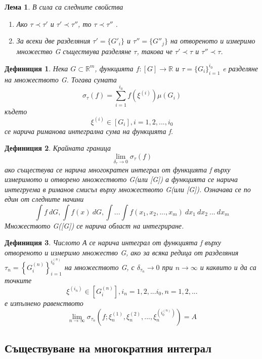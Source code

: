 \documentclass[a4paper,fleqn,12pt]{article}
\newtheorem{lemma}{Лема}[subsection]
\newtheorem{definition}{Дефиниция}[subsection]
\theoremstyle{definition}
\begin{document}
\begin{lemma}
В сила са следните свойства

\begin{enumerate}
\item Ако $\tau \prec \tau'$ и $\tau' \prec \tau''$, то $\tau \prec \tau''$ .
\item За всеки две разделяния $\tau' = \{ G'_i\}$ и $\tau'' = \{ G''_j\}$ на отвореното и измеримо множество G съществува разделяне $\tau$, такова че $\tau' \prec \tau$ и $\tau'' \prec \tau$.
\end{enumerate}

\end{lemma}

\begin{definition}
Нека $G \subset \mathbb{R}^m$, функцията $f: [G] \to \mathbb{R}$ и $\tau = \{ G_i\}_{i=1}^{i_0}$ e разделяне на множеството G. Тогава сумата 
$$\sigma_\tau (f) = \sum_{i=1} ^{i_0} f(\xi^{(i)})\mu(G_i)$$
където 
$$\xi^{(i)} \in [G_i], i = 1,2,..., i_0$$
се нарича риманова интегрална сума на функцията f. 
\end{definition}

\begin{definition}
Крайната граница 
$$\lim\limits_{\delta_\tau \to 0} \sigma_\tau (f)$$
ако съществува се нарича многократен интеграл от функцията f върху измеримото и отворено множеството G(или [G]) а функцията се нарича интегруема в риманов смисъл върху множеството G(или [G]). Означава се по един от следните начини 
$$\int f \ dG, \int f(x) \ dG, \int ... \int f(x_1, x_2,..., x_m) \ dx_1 \ dx_2 \ ... \ dx_m$$
Множеството G([G]) се нарича област на интегриране.
\end{definition}

\begin{definition}
Числото А се нарича интеграл от функцията f върху отвореното и измеримо множество G, ако за всяка редица от разделяния $\tau_n = \left \{ G_i ^{(n)}\right \}_{i=1} ^{i_0 ^{(n)}}$ на множеството G, с $\delta_{\tau_n} \to 0$ при $n \to \infty$ и каквито и да са точките
$$\xi^{(i_n)} \in [G_i ^{(n)}], i_n = 1,2,... i_0 , n = 1,2,...$$
е изпълнено равенството 
$$\lim\limits_{n \to \infty} \sigma_{\tau_n} (f;\xi_n ^{(1)}, \xi_n ^{(2)}, ..., \xi_n ^{(i_0 ^ {(n)})}) =  A$$
\end{definition}

\subsection{Съществуване на многократния интеграл}
\end{document}
